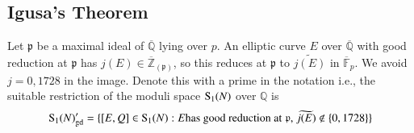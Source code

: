 \subsection{Igusa's Theorem}

Let $\mathfrak{p}$ be a maximal ideal of $\overline{\mathbb{Q}}$ lying over $p$. An elliptic curve $E$ over $\overline{\mathbb{Q}}$
with good reduction at $\mathfrak{p}$ has $j(E)\in \overline{\mathbb{Z}}_{(\mathfrak{p})}$, so this reduces at $\mathfrak{p}$
to $\widetilde{j(E)}$ in $\overline{\mathbb{F}}_p$. We avoid $j=0,1728$ in the image. Denote this with a prime in the notation
i.e., the suitable restriction of the moduli space ${\rm S}_1(N)$ over $\mathbb{Q}$ is 
\begin{equation*}
    {\rm S}_1(N)'_{\rm gd}=\{[E,Q]\in {\rm S}_1(N): E \text{has good reduction at $\mathfrak{p}$, } \widetilde{j(E)}\notin\{0,1728\} \}
\end{equation*}

